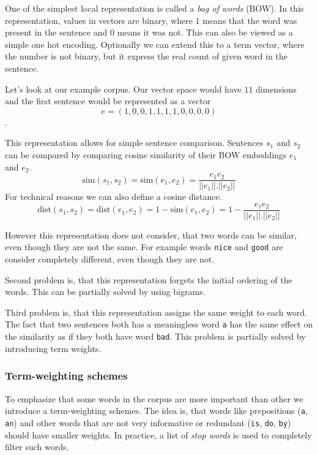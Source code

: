     One of the simplest local representation is called a \textit{bag of words} (BOW). 
    In this representation, values in vectors are binary, where $1$ means that the word was present in the sentence and $0$ means it was not.
    This can also be viewed as a simple one hot encoding.
    Optionally we can extend this to a term vector, where the number is not binary, but it express the real count of given word in the sentence.
    
    Let's look at our example corpus. 
    Our vector space would have $11$ dimensions and the first sentence would be represented as a vector
    $$e = (1, 0, 0, 1, 1, 1, 1, 0, 0, 0, 0)$$.
    
    This representation allows for simple sentence comparison. 
    Sentences $s_1$ and $s_2$ can be compared by comparing cosine similarity of their BOW embeddings $e_1$ and $e_2$.
    $$\mathrm{sim}(s_1, s_2) = \mathrm{sim}(e_1, e_2) = \frac{e_1 e_2}{||e_1||.||e_2||}$$
    For technical reasons we can also define a cosine distance. 
    $$\mathrm{dist}(s_1, s_2) = \mathrm{dist}(e_1, e_2) = 1- \mathrm{sim}(e_1, e_2) = 1 - \frac{e_1 e_2}{||e_1||.||e_2||}$$
    
    However this representation does not consider, that two words can be similar, even though they are not the same.
    For example words \texttt{nice} and \texttt{good} are consider completely different, even though they are not. 
    
    Second problem is, that this representation forgets the initial ordering of the words.
    This can be partially solved by using bigrams.
    
    Third problem is, that this representation assigns the same weight to each word.
    The fact that two sentences both has a meaningless word \texttt{a} has the same effect on the similarity as 
    if they both have word \texttt{bad}. 
    This problem is partially solved by introducing term weights.
    
    
    \subsubsection{Term-weighting schemes}
    
    To emphasize that some words in the corpus are more important than other we introduce a term-weighting schemes. 
    The idea is, that words like prepositions (\texttt{a}, \texttt{an}) and other words that are not very informative or redundant (\texttt{is}, \texttt{do}, \texttt{by}) should have smaller weights. 
    In practice, a list of \textit{stop words} is used to completely filter such words.
    

